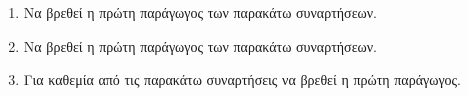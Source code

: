 \documentclass[11pt,a4paper]{article}
\begin{document}
\begin{enumerate}
\item
Να βρεθεί η πρώτη παράγωγος των παρακάτω συναρτήσεων.
\begin{multicols}{2}
\end{multicols}


\item
Να βρεθεί η πρώτη παράγωγος των παρακάτω συναρτήσεων.
\begin{multicols}{2}
\end{multicols}


\item
Για καθεμία από τις παρακάτω συναρτήσεις να βρεθεί η πρώτη παράγωγος.
\begin{multicols}{2}
\end{multicols}

\end{enumerate}
\end{document}
